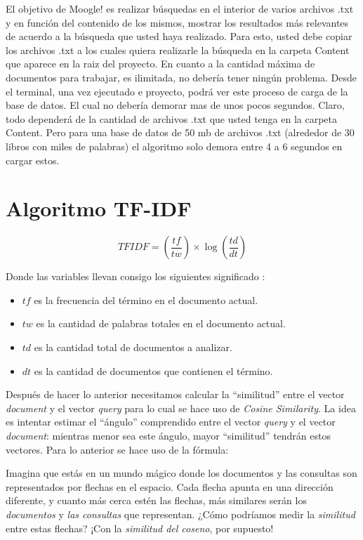 \documentclass{article}
\begin{document}
\begin{center}
El objetivo de Moogle! es realizar búsquedas en el interior de varios archivos .txt y en 
función del contenido de los mismos, mostrar los resultados más relevantes de acuerdo a 
la búsqueda que usted haya realizado. Para esto, usted debe copiar los archivos .txt a los 
cuales quiera realizarle la búsqueda en la carpeta Content que aparece en la raiz del 
proyecto.  En cuanto a la cantidad máxima de documentos para trabajar, es ilimitada, no debería tener 
ningún problema.
Desde el terminal, una vez ejecutado e proyecto, podrá ver este proceso de carga de la 
base de datos. El cual no debería demorar mas de unos pocos segundos. Claro, todo 
dependerá de la cantidad de archivos .txt que usted tenga en la carpeta Content. Pero 
para una base de datos de 50 mb de archivos .txt (alrededor de 30 libros con miles de 
palabras) el algoritmo solo demora entre 4 a 6 segundos en cargar estos.



\newpage
\section*{\textcolor{graphcolor}{{\centering Algoritmo TF-IDF}}}


\begin{equation}
	TFIDF = (\frac{tf}{tw}) \times \log(\frac{td}{dt})
\end{equation}

Donde las variables llevan consigo los siguientes significado :
\begin{itemize}
	\item $tf$ es la frecuencia del término en el documento actual.
	\item $tw$ es la cantidad de palabras totales en el documento actual.
	\item $td$ es la cantidad total de documentos a analizar.
	\item $dt$ es la cantidad de documentos que contienen el término.
\end{itemize}


Después de hacer lo anterior necesitamos calcular la ``similitud'' entre el
vector {\it document} y el vector {\it query} para lo cual se hace uso de {\it
		Cosine Similarity}. La idea es intentar estimar el ``ángulo'' comprendido entre
el vector {\it query} y el vector {\it document}: mientras menor sea este
ángulo, mayor ``similitud'' tendrán estos vectores. Para lo anterior se hace
uso de la fórmula:

Imagina que estás en un mundo mágico donde los documentos y las consultas son representados por flechas en el espacio.
 Cada flecha apunta en una dirección diferente, y cuanto más cerca estén las flechas, más similares serán los {\it documentos} y {\it las consultas} que representan.
 ¿Cómo podríamos medir la {\it similitud} entre estas flechas? ¡Con la{ \it similitud del coseno}, por supuesto!


\end{center}
\end{document}
